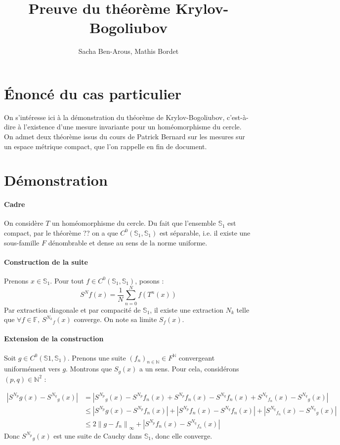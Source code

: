 \documentclass{article}
\title{Preuve du théorème Krylov-Bogoliubov}
\author{Sacha Ben-Arous, Mathis Bordet}
\date{}
\begin{document}
\maketitle

\section{Énoncé du cas particulier}

On s'intéresse ici à la démonstration du théorème de Krylov-Bogoliubov, c'est-à-dire à l'existence d'une mesure invariante pour un homéomorphisme du cercle. On admet deux théorème issus du cours de Patrick Bernard sur les mesures sur un espace métrique compact, que l'on rappelle en fin de document.

\section{Démonstration}

\paragraph{Cadre}
On considère $T$ un homéomorphisme du cercle. Du fait que l'ensemble $\mathbb{S}_1$ est compact, par le théorème ?? on a que $C^0(\mathbb{S}_1,\mathbb{S}_1)$ est séparable, i.e. il existe une sous-famille $F$ dénombrable et dense au sens de la norme uniforme.

\paragraph{Construction de la suite}
Prenons $x \in \mathbb{S}_1$.
Pour tout $f \in C^0(\mathbb{S}_1,\mathbb{S}_1)$, posons :
\[
{S^N}f (x)= \frac{1}{N} \sum_{n=0}^N f(T^n(x))
\]
Par extraction diagonale et par compacité de $\mathbb{S}_1$, il existe une extraction $N_k$ telle que $\forall f \in \mathbb{F}, \: {S^{N_k}}_f (x)$ converge. On note sa limite $S_f (x)$.

\paragraph{Extension de la construction}
Soit $g \in C^0(\mathbb{S}1,\mathbb{S}_1)$. Prenons une suite $(f_n)_{n \in \mathbb{N}} \in F^\mathbb{N}$ convergeant uniformément vers $g$.
Montrons que $S_g (x)$ a un sens. Pour cela, considérons $(p, q) \in \mathbb{N}^2$ :

\[
\begin{aligned}
|{S^{N_p}}g (x) - {S^{N_q}}_g (x)| &= \left| {S^{N_p}}_g (x) - {S^{N_p}}{f_n} (x) + {S^{N_p}}{f_n} (x) - {S^{N_q}}{f_n} (x) + {S^{N_q}}_{f_n} (x) - {S^{N_q}}_g (x) \right| \\
&\leq \left| {S^{N_p}}g (x) - {S^{N_p}}{f_n} (x) \right| + \left| {S^{N_p}}{f_n} (x) - {S^{N_q}}{f_n} (x) \right| + \left| {S^{N_q}}_{f_n} (x) - {S^{N_q}}_g (x) \right| \\
&\leq 2 \left\| g - f_n \right\|_\infty + \left| {S^{N_p}}{f_n} (x) - {S^{N_q}}_{f_n} (x) \right|
\end{aligned}
\]
Donc ${S^{N_p}}_g (x)$ est une suite de Cauchy dans $\mathbb{S}_1$, donc elle converge.
\end{document}
